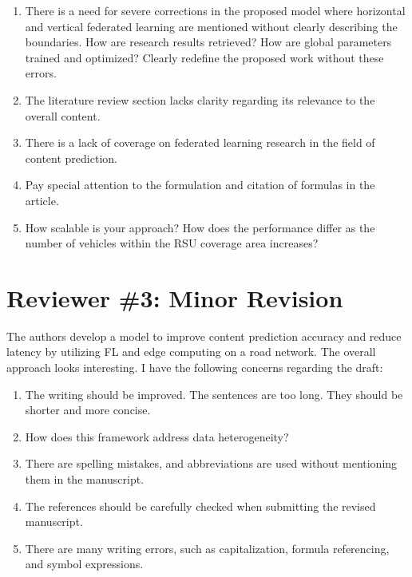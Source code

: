 \documentclass[a4paper,12pt]{article}
\begin{document}
\begin{enumerate}
    \item There is a need for severe corrections in the proposed model where horizontal and vertical federated learning are mentioned without clearly describing the boundaries. How are research results retrieved? How are global parameters trained and optimized? Clearly redefine the proposed work without these errors.
    \item The literature review section lacks clarity regarding its relevance to the overall content.
    \item There is a lack of coverage on federated learning research in the field of content prediction.
    \item Pay special attention to the formulation and citation of formulas in the article.
    \item How scalable is your approach? How does the performance differ as the number of vehicles within the RSU coverage area increases?
\end{enumerate}

\section*{Reviewer \#3: Minor Revision}

The authors develop a model to improve content prediction accuracy and reduce latency by utilizing FL and edge computing on a road network. The overall approach looks interesting. I have the following concerns regarding the draft:

\begin{enumerate}
    \item The writing should be improved. The sentences are too long. They should be shorter and more concise.
    \item How does this framework address data heterogeneity?
    \item There are spelling mistakes, and abbreviations are used without mentioning them in the manuscript.
    \item The references should be carefully checked when submitting the revised manuscript.
    \item There are many writing errors, such as capitalization, formula referencing, and symbol expressions.
\end{enumerate}
\end{document}
